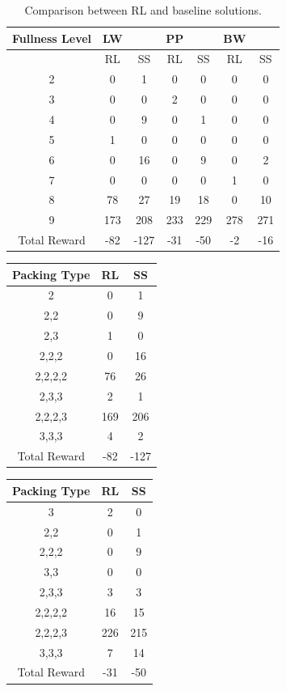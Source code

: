 \documentclass{article}
\begin{document}
\begin{table}[h!]
	\centering
	\begin{tabular}{ |c|cc|cc|cc| } 
		\hline
		Fullness Level&LW&&PP&&BW& \\
		\hline
		& RL&SS&RL&SS&RL&SS \\
		\hline
		
		2 & 0 & 1 & 0 & 0 & 0 & 0 \\
		\hline
		3 & 0 & 0 & 2 & 0 & 0 & 0 \\
		\hline
		4 & 0 & 9 & 0 & 1 & 0 & 0 \\
		\hline
		5 & 1 & 0 & 0 & 0 & 0 & 0 \\
		\hline
		6 & 0 & 16 & 0 & 9 & 0 & 2 \\
		\hline
		7 & 0 & 0 & 0 & 0 & 1 & 0 \\
		\hline
		8 & 78 & 27 & 19 & 18 & 0 & 10 \\
		\hline
		9 & 173 & 208 & 233 & 229 & 278 & 271 \\
		\hline
		Total Reward & -82 & -127 & -31 & -50 & -2 & -16 \\
		\hline
	\end{tabular}
	\caption{Comparison between RL and baseline solutions.}
	\label{table:bin_packing_RL_baseline_sol_comp}
\end{table}
\ifx
\begin{table}[h!]
	\centering
	\begin{tabular}{ |c|c|c| } 
		\hline
		Packing Type & RL & SS \\ 
		\hline
		2 & 0 & 1  \\ 
		\hline
		2,2 & 0 & 9 \\
		\hline
		2,3 & 1 & 0 \\
		\hline
		2,2,2 & 0 & 16 \\   
		\hline
		2,2,2,2 & 76 & 26 \\
		\hline
		2,3,3 & 2 & 1 \\
		\hline
		2,2,2,3 & 169 & 206 \\
		\hline
		3,3,3 & 4 & 2 \\
		\hline
		Total Reward & -82 &-127 \\
		\hline
	\end{tabular}
\end{table}

\begin{table}[h!]
	\centering
	\begin{tabular}{ |c|c|c| } 
		\hline
		Packing Type & RL & SS \\ 
		\hline
		3 & 2 & 0 \\
		\hline
		2,2 & 0 & 1 \\
		\hline
		2,2,2 & 0 & 9 \\   
		\hline
		3,3 & 0 & 0 \\
		\hline
		2,3,3 & 3 & 3 \\
		\hline
		2,2,2,2 & 16 & 15 \\
		\hline
		2,2,2,3 & 226  & 215 \\
		\hline
		3,3,3 & 7 & 14 \\
		\hline
		Total Reward & -31 &-50 \\
		\hline
	\end{tabular}
\end{table}
\end{document}
